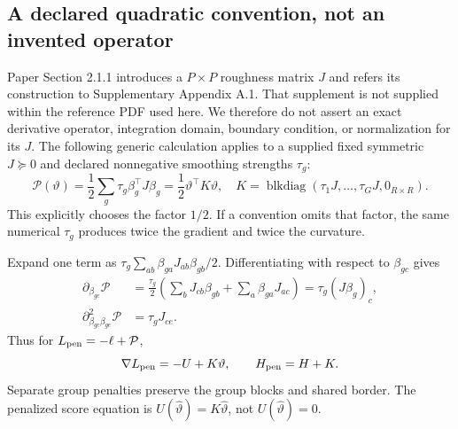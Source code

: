 \documentclass[11pt,a4paper]{article}
\newcommand{\blkdiag}{\operatorname{blkdiag}}
\numberwithin{equation}{section}
\begin{document}
\subsection{A declared quadratic convention, not an invented operator}
Paper Section 2.1.1 introduces a $P\times P$ roughness matrix $J$ and
refers its construction to Supplementary Appendix A.1.
That supplement is not supplied within the reference PDF used here.
We therefore do not assert an exact derivative operator, integration
domain, boundary condition, or normalization for its $J$.
The following generic calculation applies to a supplied fixed symmetric
$J\succeq0$ and declared nonnegative smoothing strengths $\tau_g$:
\begin{equation}
 \mathcal P(\vartheta)=\frac12\sum_g\tau_g\beta_g^\top J\beta_g
 =\frac12\vartheta^\top K\vartheta,\quad
 K=\blkdiag(\tau_1J,\ldots,\tau_GJ,0_{R\times R}).
 \label{eq:penalty}
\end{equation}
This explicitly chooses the factor $1/2$.
If a convention omits that factor, the same numerical $\tau_g$
produces twice the gradient and twice the curvature.

Expand one term as $\tau_g\sum_{ab}\beta_{ga}J_{ab}\beta_{gb}/2$.
Differentiating with respect to $\beta_{gc}$ gives
\begin{align}
 \partial_{\beta_{gc}}\mathcal P
 &=\frac{\tau_g}{2}
       \left(\sum_bJ_{cb}\beta_{gb}+\sum_a\beta_{ga}J_{ac}\right)
 =\tau_g(J\beta_g)_c,\\
 \partial_{\beta_{gc}\beta_{ge}}^2\mathcal P&=\tau_gJ_{ce}.
\end{align}
Thus for $L_{\rm pen}=-\ell+\mathcal P$,
\begin{equation}
 \nabla L_{\rm pen}=-U+K\vartheta,\qquad H_{\rm pen}=H+K.
\end{equation}
Separate group penalties preserve the group blocks and shared border.
The penalized score equation is $U(\widehat\vartheta)=K\widehat\vartheta$,
not $U(\widehat\vartheta)=0$.
\end{document}
